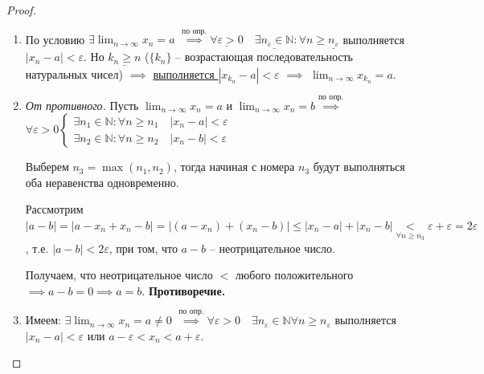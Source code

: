 \documentclass[a4paper,oneside]{article}
\newcommand{\bydef}{\stackrel{\text{по опр.}}{\implies}} %
\newcommand{\dslim}{\displaystyle\lim}
\newcommand{\dslimn}{\dslim_{n \to \infty}}
\theoremstyle{definition}
\theoremstyle{definition}
\theoremstyle{definition}
\begin{document}
\begin{proof}
    \begin{enumerate}
        \item 
            По условию $\exists \dslimn x_n = a$
            $\bydef \underline{\forall \varepsilon > 0}
            \quad \underline{\exists n_\varepsilon \in \mathbb{N}}: 
            \forall n \ge \underline{n_\varepsilon}$ выполняется 
            $\left| x_n - a \right| < \varepsilon$. Но $\underline{k_n \ge n}$
            ($\{k_n\}$ -- возрастающая последовательность натуральных чисел)
            $\implies$ \underline{выполняется $\left| x_{k_n} - a \right| < \varepsilon$}
            $\implies$ $\dslimn x_{k_n} = a$.
    
        \item 
            \textit{От противного.} Пусть $\dslimn x_n = a$ и
            $\dslimn x_n = b \bydef$
            $\forall \varepsilon > 0 \begin{cases}
                \exists n_1 \in \mathbb{N}: \forall n \ge n_1 \quad \left| x_n - a \right| < \varepsilon \\
                \exists n_2 \in \mathbb{N}: \forall n \ge n_2 \quad \left| x_n - b \right| < \varepsilon
            \end{cases}$
        
            Выберем $n_3 = \max \left( n_1, n_2 \right)$, тогда начиная с номера $n_3$ будут выполняться оба
            неравенства одновременно.
        
            Рассмотрим $\left| a - b \right| = \left| a - x_n + x_n - b \right| = 
            \left| (a - x_n) + (x_n - b) \right| \le \left| x_n - a \right| + 
            \left| x_n - b \right| \underset{\forall n \ge n_3}{<}
            \varepsilon + \varepsilon = 2 \varepsilon$, т.е. $\left| a - b \right| < 2 \varepsilon$,
            при том, что $a - b$ -- неотрицательное число.
        
            Получаем, что неотрицательное число $<$ любого положительного 
            $\implies a - b = 0 \implies a = b$. \textbf{Противоречие.}
    
        \item 
            Имеем: $\exists \dslimn x_n = a \ne 0$
            $\bydef \forall \varepsilon > 0 \quad \exists n_\varepsilon \in \mathbb{N} 
            \forall n \ge n_\varepsilon$ выполняется $\left| x_n - a \right| < \varepsilon$
            или $a - \varepsilon < x_n < a + \varepsilon$.
            

\end{enumerate}
\end{proof}
\end{document}

